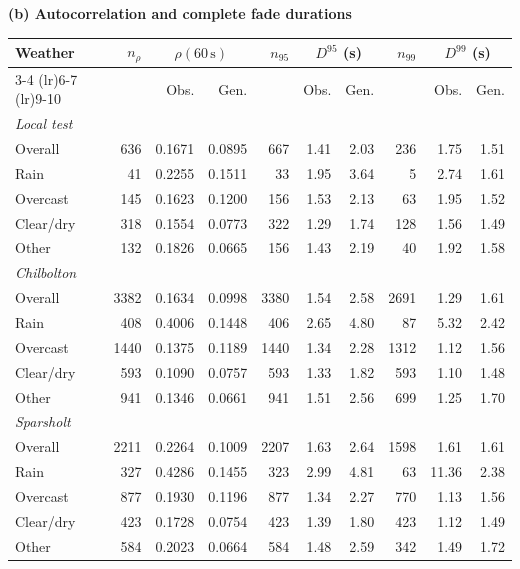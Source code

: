 \begin{table}[t]
\begin{tabular*}{\columnwidth}
\bottomrule
\end{tabular*}

\par\medskip
\textbf{(b) Autocorrelation and complete fade durations}
\par\smallskip

\begin{tabular*}{\columnwidth}
{@{\extracolsep{\fill}}lrrrrrrrrr@{}}
\toprule
Weather & $n_{\rho}$
& \multicolumn{2}{c}{$\rho(60\,\mathrm{s})$}
& $n_{95}$
& \multicolumn{2}{c}{$D^{95}$ (s)}
& $n_{99}$
& \multicolumn{2}{c}{$D^{99}$ (s)} \\
\cmidrule(lr){3-4}
\cmidrule(lr){6-7}
\cmidrule(lr){9-10}
& & Obs. & Gen. & & Obs. & Gen. & & Obs. & Gen. \\
\midrule

\multicolumn{10}{l}{\textit{Local test}} \\
Overall
& 636 & 0.1671 & 0.0895
& 667 & 1.41 & 2.03
& 236 & 1.75 & 1.51 \\
Rain
& 41 & 0.2255 & 0.1511
& 33 & 1.95 & 3.64
& 5 & 2.74 & 1.61 \\
Overcast
& 145 & 0.1623 & 0.1200
& 156 & 1.53 & 2.13
& 63 & 1.95 & 1.52 \\
Clear/dry
& 318 & 0.1554 & 0.0773
& 322 & 1.29 & 1.74
& 128 & 1.56 & 1.49 \\
Other
& 132 & 0.1826 & 0.0665
& 156 & 1.43 & 2.19
& 40 & 1.92 & 1.58 \\

\multicolumn{10}{l}{\textit{Chilbolton}} \\
Overall
& 3382 & 0.1634 & 0.0998
& 3380 & 1.54 & 2.58
& 2691 & 1.29 & 1.61 \\
Rain
& 408 & 0.4006 & 0.1448
& 406 & 2.65 & 4.80
& 87 & 5.32 & 2.42 \\
Overcast
& 1440 & 0.1375 & 0.1189
& 1440 & 1.34 & 2.28
& 1312 & 1.12 & 1.56 \\
Clear/dry
& 593 & 0.1090 & 0.0757
& 593 & 1.33 & 1.82
& 593 & 1.10 & 1.48 \\
Other
& 941 & 0.1346 & 0.0661
& 941 & 1.51 & 2.56
& 699 & 1.25 & 1.70 \\

\multicolumn{10}{l}{\textit{Sparsholt}} \\
Overall
& 2211 & 0.2264 & 0.1009
& 2207 & 1.63 & 2.64
& 1598 & 1.61 & 1.61 \\
Rain
& 327 & 0.4286 & 0.1455
& 323 & 2.99 & 4.81
& 63 & 11.36 & 2.38 \\
Overcast
& 877 & 0.1930 & 0.1196
& 877 & 1.34 & 2.27
& 770 & 1.13 & 1.56 \\
Clear/dry
& 423 & 0.1728 & 0.0754
& 423 & 1.39 & 1.80
& 423 & 1.12 & 1.49 \\
Other
& 584 & 0.2023 & 0.0664
& 584 & 1.48 & 2.59
& 342 & 1.49 & 1.72 \\


\end{tabular*}
\end{table}
